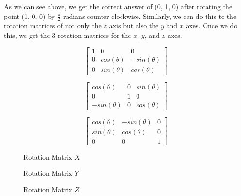 \documentclass[14pt]{article}
\begin{document}
\vspace*{1em}

As we can see above, we get the correct answer of (0, 1, 0) after rotating the point (1, 0, 0) by $\frac{\pi}{2}$ radians counter clockwise. Similarly, we can do this to the rotation matrices of not only the $z$ axis but also the $y$ and $x$ axes. Once we do this, we get the 3 rotation matrices for the $x$, $y$, and $z$ axes.

\begin{figure}[h]
	\vspace*{1em}
	\begin{center}
		\begin{minipage}[b]{0.3\textwidth}
			\centering
			
			$$
			\begin{bmatrix}
			1 & 0 & 0 \\
			0 & cos(\theta) & -sin(\theta) \\ 
			0 & sin(\theta) & cos(\theta)
			\end{bmatrix}
			$$
		\end{minipage}
		\hfill
		\begin{minipage}[b]{0.3\textwidth}
			\centering
			$$
			\begin{bmatrix}
			cos(\theta) & 0 & sin(\theta) \\
			0 & 1 & 0 \\
			-sin(\theta) & 0 & cos(\theta)
			\end{bmatrix}			
			$$
		\end{minipage}
		\hfill
		\begin{minipage}[b]{0.3\textwidth}
			\centering
			$$
			\begin{bmatrix}
			cos(\theta) & -sin(\theta) & 0 \\
			sin(\theta) & cos(\theta) & 0 \\
			0 & 0 & 1
			\end{bmatrix}			
			$$
		\end{minipage}
	\end{center}
	\begin{center}
		\begin{minipage}[t]{0.3\textwidth}
			\caption*{Rotation Matrix $X$}
		\end{minipage}
		\hfill
		\begin{minipage}[t]{0.3\textwidth}
			\caption*{Rotation Matrix $Y$}
		\end{minipage}
		\hfill
		\begin{minipage}[t]{0.3\textwidth}
			\caption*{Rotation Matrix $Z$}
		\end{minipage}
	\end{center}
\end{figure}
\end{document}
